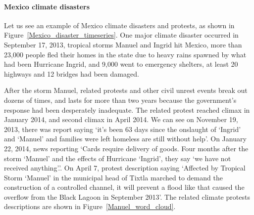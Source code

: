 \documentclass[9pt,twocolumn,twoside]{pnas-new}
\begin{document}
\paragraph{Mexico climate disasters}
Let us see an example of Mexico climate disasters and protests, as shown in Figure~\ref{Mexico_disaster_timeseries}. One major climate disaster occurred in September 17, 2013, tropical storms Manuel and Ingrid hit Mexico, more than 23,000 people fled their homes in the state due to heavy rains spawned by what had been Hurricane Ingrid, and 9,000 went to emergency shelters, at least 20 highways and 12 bridges had been damaged.


After the storm Manuel, related protests and other civil unrest events break out dozens of times, and lasts for more than two years because the government's response had been desperately inadequate. The related protest reached  climax in January 2014, and second climax in April 2014. We can see on November 19, 2013, there was report saying `it's been 63 days since the onslaught of `Ingrid' and `Manuel' and families were left homeless are still without help'. On January 22, 2014, news reporting `Cards require delivery of goods. Four months after the storm `Manuel' and the effects of Hurricane `Ingrid', they say `we have not received anything'.'. On April 7, protest description saying `Affected by Tropical Storm `Manuel' in the municipal head of Tixtla marched to demand the construction of a controlled channel, it will prevent a flood like that caused the overflow from the Black Lagoon in September 2013'. The related climate protests descriptions are shown in Figure~\ref{Manuel_word_cloud}.

\end{document}
